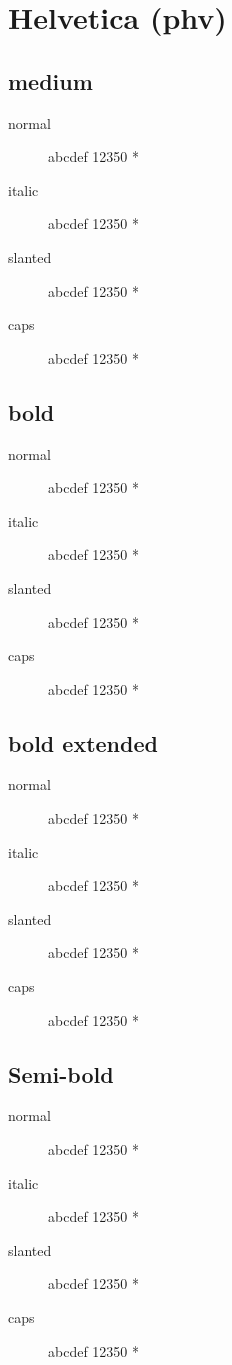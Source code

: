 \section{Helvetica (phv)}

\subsection{medium}
\begin{description}
    \item [normal]  abcdef 12350 *
    \item [italic]  abcdef 12350 *
    \item [slanted]  abcdef 12350 *
    \item [caps]  abcdef 12350 *
\end{description}
    
\subsection{bold}
\begin{description}
    \item [normal]  abcdef 12350 *
    \item [italic]  abcdef 12350 *
    \item [slanted]  abcdef 12350 *
    \item [caps]  abcdef 12350 *
\end{description}
    
\subsection{bold extended}
\begin{description}
    \item [normal]  abcdef 12350 *
    \item [italic]  abcdef 12350 *
    \item [slanted]  abcdef 12350 *
    \item [caps]  abcdef 12350 *
\end{description}

\subsection{Semi-bold}
\begin{description}
    \item [normal]  abcdef 12350 *
    \item [italic]  abcdef 12350 *
    \item [slanted]  abcdef 12350 *
    \item [caps]  abcdef 12350 *
\end{description}

